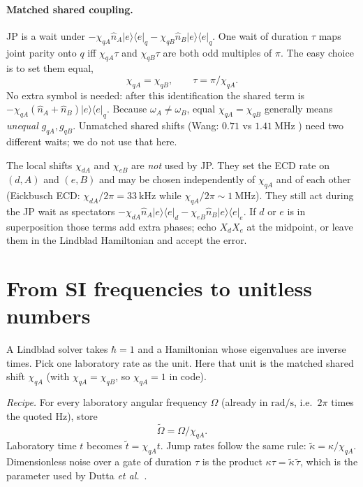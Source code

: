 \documentclass[11pt]{article}
\newcommand{\Pe}[1]{\lvert e\rangle\!\langle e\rvert_{#1}}
\begin{document}
\paragraph{Matched shared coupling.}
JP is a wait under $-\chi_{qA}\hat{n}_A\Pe{q}-\chi_{qB}\hat{n}_B\Pe{q}$.
One wait of duration $\tau$ maps joint parity onto $q$ iff
$\chi_{qA}\tau$ and $\chi_{qB}\tau$ are both odd multiples of $\pi$.
The easy choice is to set them equal,
\begin{equation}
\chi_{qA}=\chi_{qB},\qquad \tau=\pi/\chi_{qA} .
\label{eq:match}
\end{equation}
No extra symbol is needed: after this identification the shared term is
$-\chi_{qA}(\hat{n}_A+\hat{n}_B)\Pe{q}$.
Because $\omega_A\neq\omega_B$, equal $\chi_{qA}=\chi_{qB}$ generally means
\emph{unequal} $g_{qA},g_{qB}$.  Unmatched shared shifts (Wang:
$0.71$ vs $1.41~\mathrm{MHz}$ \cite{Wang2016}) need two different waits;
we do not use that here.

The local shifts $\chi_{dA}$ and $\chi_{eB}$ are \emph{not} used by JP.
They set the ECD rate on $(d,A)$ and $(e,B)$ and may be chosen
independently of $\chi_{qA}$ and of each other (Eickbusch ECD:
$\chi_{dA}/2\pi=33~\mathrm{kHz}$ while $\chi_{qA}/2\pi\sim 1~\mathrm{MHz}$).
They still act during the JP wait as spectators
$-\chi_{dA}\hat{n}_A\Pe{d}-\chi_{eB}\hat{n}_B\Pe{e}$.  If
$d$ or $e$ is in superposition those terms add extra phases; echo
$X_d X_e$ at the midpoint, or leave them in the Lindblad Hamiltonian
and accept the error.

\section{From SI frequencies to unitless numbers}

A Lindblad solver takes $\hbar=1$ and a Hamiltonian whose eigenvalues are
inverse times.  Pick one laboratory rate as the unit.  Here that unit is
the matched shared shift $\chi_{qA}$ (with $\chi_{qA}=\chi_{qB}$, so
$\chi_{qA}=1$ in code).

\textit{Recipe.}  For every laboratory angular frequency $\Omega$
(already in $\mathrm{rad/s}$, i.e.\ $2\pi$ times the quoted $\mathrm{Hz}$),
store
\begin{equation}
\widetilde{\Omega}=\Omega/\chi_{qA} .
\end{equation}
Laboratory time $t$ becomes $\tilde t=\chi_{qA} t$.  Jump rates follow the
same rule: $\tilde\kappa=\kappa/\chi_{qA}$.  Dimensionless noise over a
gate of duration $\tau$ is the product $\kappa\tau=\tilde\kappa\,\tilde\tau$,
which is the parameter used by Dutta \emph{et al.}\ \cite{Dutta2025}.
\end{document}
